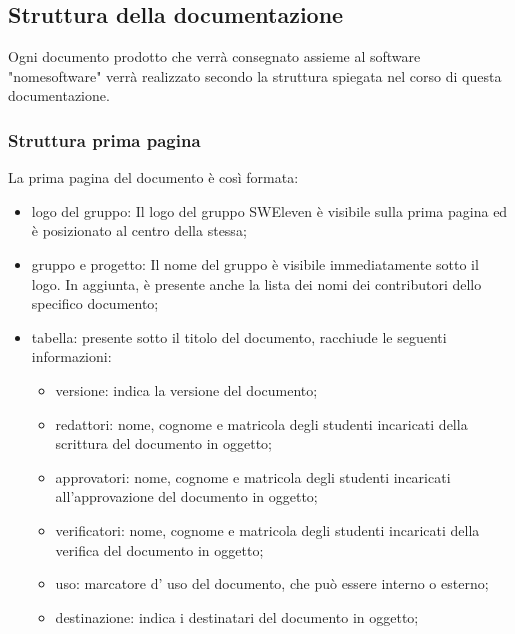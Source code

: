 \subsection{Struttura della documentazione}
Ogni documento prodotto che verrà consegnato assieme al software "nomesoftware" verrà realizzato secondo la struttura spiegata nel corso di questa documentazione.

\subsubsection{Struttura prima pagina}
La prima pagina del documento è così formata:
\begin{itemize}
	\item logo del gruppo: Il logo del gruppo SWEleven è visibile sulla prima pagina ed è posizionato al centro della stessa;
	\item gruppo e progetto: Il nome del gruppo è visibile immediatamente sotto il logo. In aggiunta, è presente anche la lista dei nomi dei contributori dello specifico documento;
	\item tabella: presente sotto il titolo del documento, racchiude le seguenti informazioni:
	\begin{itemize}
		\item versione: indica la versione del documento;
		\item redattori: nome, cognome e matricola degli studenti incaricati della scrittura del documento in oggetto;
		\item approvatori: nome, cognome e matricola degli studenti incaricati all’approvazione del documento in oggetto;
		\item verificatori: nome, cognome e matricola degli studenti incaricati della verifica del documento in oggetto;
		\item uso: marcatore d’ uso del documento, che può essere interno o esterno;
		\item destinazione: indica i destinatari del documento in oggetto;
		\end{itemize}
	\end{itemize}
	
